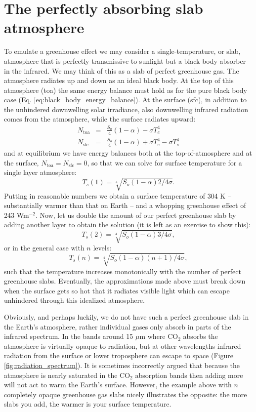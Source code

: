 \documentclass[12pt]{book}
\begin{document}
\section{The perfectly absorbing slab atmosphere}
To emulate a greenhouse effect we may consider a single-temperature, or slab, atmosphere that is perfectly transmissive to sunlight but a black body absorber in the infrared. We may think of this as a slab of perfect greenhouse gas. The atmosphere radiates up and down as an ideal black body. At the top of this atmosphere (toa) the same energy balance must hold as for the pure black body case (Eq. \ref{eq:black_body_energy_balance}). At the surface (sfc), in addition to the unhindered downwelling solar irradiance, also downwelling infrared radiation comes from the atmosphere, while the surface radiates upward: 
\begin{eqnarray}
N_\textrm{toa} &=&  \frac{S_o}{4}(1-\alpha) - \sigma T_e^4  \\ 
N_\textrm{sfc} &=&  \frac{S_o}{4}(1-\alpha) + \sigma T_e^4 - \sigma T_s^4  \nonumber
\label{eq:perfect_greenhouse}
\end{eqnarray}
and at equilibrium we have energy balances both at the top-of-atmosphere and at the surface, $N_\textrm{toa}=N_\textrm{sfc}=0$, so that we can solve for surface temperature for a single layer atmosphere:
\begin{equation}
T_s(1) = \sqrt[4]{S_o(1-\alpha)2/4\sigma}. 
\end{equation}
Putting in reasonable numbers we obtain a surface temperature of 304 K -- substantially warmer than that on Earth -- and a whopping greenhouse effect of 243 Wm$^{-2}$. Now, let us double the amount of our perfect greenhouse slab by adding another layer to obtain the solution (it is left as an exercise to show this):
\begin{equation}
T_s(2) = \sqrt[4]{S_o(1-\alpha)3/4\sigma},
\label{eq:ntwo}
\end{equation}
or in the general case with $n$ levels:
\begin{equation}
T_s(n) = \sqrt[4]{S_o(1-\alpha)(n+1)/4\sigma},
\end{equation}
such that the temperature increases monotonically with the number of perfect greenhouse slabs. Eventually, the approximations made above must break down when the surface gets so hot that it radiates visible light which can escape unhindered through this idealized atmosphere. 

Obviously, and perhaps luckily, we do not have such a perfect greenhouse slab in the Earth's atmosphere, rather individual gases only absorb in parts of the infrared spectrum. In the bands around 15 $\mu$m where CO$_2$ absorbs the atmosphere is virtually opaque to radiation, but at other wavelengths infrared radiation from the surface or lower troposphere can escape to space (Figure \ref{fig:radiation_spectrum}). It is sometimes incorrectly argued that because the atmosphere is nearly saturated in the CO$_2$ absorption bands then adding more will not act to warm the Earth's surface. However, the example above with $n$ completely opaque greenhouse gas slabs nicely illustrates the opposite: the more slabs you add, the warmer is your surface temperature.
\end{document}
